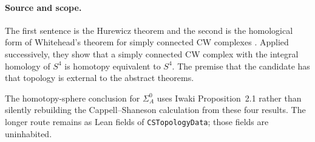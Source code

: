 \paragraph{Source and scope.}
The first sentence is the Hurewicz theorem and the second is the homological
form of Whitehead's theorem for simply connected CW complexes
\cite[Sections~4.1--4.2]{Hatcher2002}.  Applied successively, they show that a
simply connected CW complex with the integral homology of $S^4$ is homotopy
equivalent to $S^4$.  The premise that the candidate has that topology is
external to the abstract theorems.

\begin{remark}\label{rem:topology-tools}
The homotopy-sphere conclusion for $\Sigma_A^0$ uses Iwaki
Proposition~2.1 rather than silently rebuilding the Cappell--Shaneson
calculation from these four results.  The longer route remains as Lean
fields of \texttt{CSTopologyData}; those fields are uninhabited.
\end{remark}
